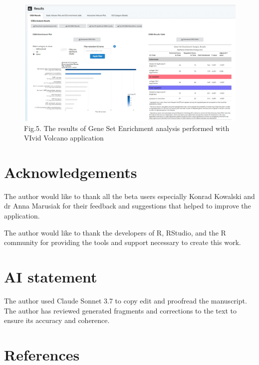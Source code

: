 \documentclass[
]{article}
\begin{document}
\begin{figure}
\centering
\includegraphics{Paper_figures/GSEA.jpeg}
\caption{Fig.5. The results of Gene Set Enrichment analysis performed
with VIvid Volcano application}
\end{figure}

\section{Acknowledgements}\label{acknowledgements}

The author would like to thank all the beta users especially Konrad
Kowalski and dr Anna Marusiak for their feedback and suggestions that
helped to improve the application.

The author would like to thank the developers of R, RStudio, and the R
community for providing the tools and support necessary to create this
work.

\section{AI statement}\label{ai-statement}

The author used Claude Sonnet 3.7 to copy edit and proofread the
manuscript. The author has reviewed generated fragments and corrections
to the text to ensure its accuracy and coherence.

\section*{References}\label{references}
\end{document}
